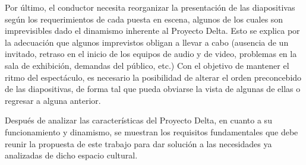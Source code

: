 			Por último, el conductor necesita reorganizar la presentación de las diapositivas según los requerimientos de cada puesta en escena, algunos de los cuales son imprevisibles dado el dinamismo inherente al Proyecto Delta. Esto se explica por la adecuación que algunos imprevistos obligan a llevar a cabo (ausencia de un invitado, retraso en el inicio de los equipos de audio y de video, problemas en la sala de exhibición, demandas del público, etc.) Con el objetivo de mantener el ritmo del espectáculo, es necesario la posibilidad de alterar el orden preconcebido de las diapositivas, de forma tal que pueda obviarse la vista de algunas de ellas o regresar a alguna anterior.			

		Después de analizar las características del Proyecto Delta, en cuanto a su funcionamiento y dinamismo, se muestran los requisitos fundamentales que debe reunir la propuesta de este trabajo para dar solución a las necesidades ya analizadas de dicho espacio cultural.

